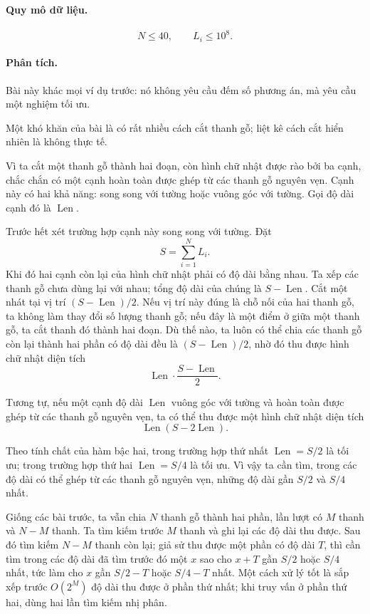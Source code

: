 \documentclass[11pt]{article}
\begin{document}
\paragraph{Quy mô dữ liệu.}
\[
  N\le 40,\qquad L_i\le 10^8.
\]

\paragraph{Phân tích.}
Bài này khác mọi ví dụ trước: nó không yêu cầu đếm số phương án, mà yêu cầu
một nghiệm tối ưu.

Một khó khăn của bài là có rất nhiều cách cắt thanh gỗ; liệt kê cách cắt hiển
nhiên là không thực tế.

Vì ta cắt một thanh gỗ thành hai đoạn, còn hình chữ nhật được rào bởi ba
cạnh, chắc chắn có một cạnh hoàn toàn được ghép từ các thanh gỗ nguyên vẹn.
Cạnh này có hai khả năng: song song với tường hoặc vuông góc với tường. Gọi
độ dài cạnh đó là \(\operatorname{Len}\).

Trước hết xét trường hợp cạnh này song song với tường. Đặt
\[
  S=\sum_{i=1}^{N} L_i.
\]
Khi đó hai cạnh còn lại của hình chữ nhật phải có độ dài bằng nhau. Ta xếp
các thanh gỗ chưa dùng lại với nhau; tổng độ dài của chúng là
\(S-\operatorname{Len}\). Cắt một nhát tại vị trí
\((S-\operatorname{Len})/2\). Nếu vị trí này đúng là chỗ nối của hai thanh gỗ,
ta không làm thay đổi số lượng thanh gỗ; nếu đây là một điểm ở giữa một thanh
gỗ, ta cắt thanh đó thành hai đoạn. Dù thế nào, ta luôn có thể chia các thanh
gỗ còn lại thành hai phần có độ dài đều là
\((S-\operatorname{Len})/2\), nhờ đó thu được hình chữ nhật diện tích
\[
  \operatorname{Len}\cdot\frac{S-\operatorname{Len}}{2}.
\]

Tương tự, nếu một cạnh độ dài \(\operatorname{Len}\) vuông góc với tường và
hoàn toàn được ghép từ các thanh gỗ nguyên vẹn, ta có thể thu được một hình
chữ nhật diện tích
\[
  \operatorname{Len}(S-2\operatorname{Len}).
\]

Theo tính chất của hàm bậc hai, trong trường hợp thứ nhất
\(\operatorname{Len}=S/2\) là tối ưu; trong trường hợp thứ hai
\(\operatorname{Len}=S/4\) là tối ưu. Vì vậy ta cần tìm, trong các độ dài có
thể ghép từ các thanh gỗ nguyên vẹn, những độ dài gần \(S/2\) và \(S/4\) nhất.

Giống các bài trước, ta vẫn chia \(N\) thanh gỗ thành hai phần, lần lượt có
\(M\) thanh và \(N-M\) thanh. Ta tìm kiếm trước \(M\) thanh và ghi lại các độ
dài thu được. Sau đó tìm kiếm \(N-M\) thanh còn lại; giả sử thu được một phần
có độ dài \(T\), thì cần tìm trong các độ dài đã tìm trước đó một \(x\) sao
cho \(x+T\) gần \(S/2\) hoặc \(S/4\) nhất, tức làm cho \(x\) gần
\(S/2-T\) hoặc \(S/4-T\) nhất. Một cách xử lý tốt là sắp xếp trước
\(O(2^M)\) độ dài thu được ở phần thứ nhất; khi truy vấn ở phần thứ hai, dùng
hai lần tìm kiếm nhị phân.
\end{document}
